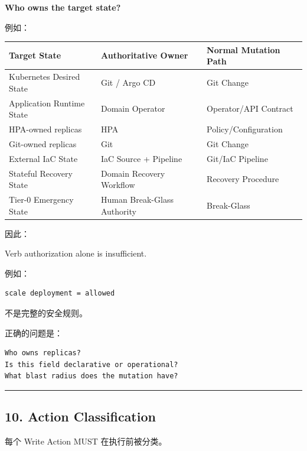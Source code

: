 \documentclass[11pt,a4paper]{article}
\begin{document}
\begin{gfmBlockquote}
\textbf{Who owns the target state?}
\end{gfmBlockquote}
例如：

\begin{table}[htbp]
\centering
\small
\begin{tabularx}{\textwidth}{| X | X | X |}
\hline
\rowcolor{codebg}
\textbf{Target State} & \textbf{Authoritative Owner} & \textbf{Normal Mutation Path} \\ \hline
Kubernetes Desired State & Git / Argo CD & Git Change \\ \hline
\rowcolor{codebg!50} Application Runtime State & Domain Operator & Operator/API Contract \\ \hline
HPA-owned replicas & HPA & Policy/Configuration \\ \hline
\rowcolor{codebg!50} Git-owned replicas & Git & Git Change \\ \hline
External IaC State & IaC Source + Pipeline & Git/IaC Pipeline \\ \hline
\rowcolor{codebg!50} Stateful Recovery State & Domain Recovery Workflow & Recovery Procedure \\ \hline
Tier-0 Emergency State & Human Break-Glass Authority & Break-Glass \\ \hline
\end{tabularx}
\end{table}
因此：

\begin{gfmBlockquote}
Verb authorization alone is insufficient.
\end{gfmBlockquote}
例如：

\begin{lstlisting}[language=text]
scale deployment = allowed
\end{lstlisting}
不是完整的安全规则。

正确的问题是：

\begin{lstlisting}[language=text]
Who owns replicas?
Is this field declarative or operational?
What blast radius does the mutation have?
\end{lstlisting}
\vspace{0.5em}\hrule\vspace{0.5em}
\subsection{10. Action Classification}
每个 Write Action MUST 在执行前被分类。
\end{document}
